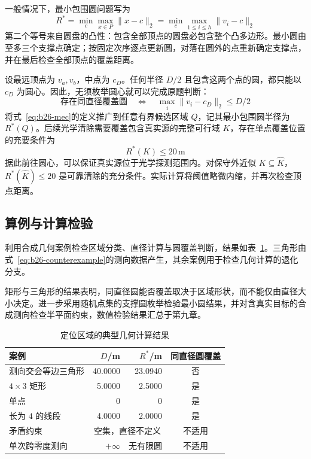 \documentclass[withoutpreface,bwprint]{cumcmthesis} %
\begin{document}
一般情况下，最小包围圆问题写为
\begin{equation}
 R^*=\min_c\max_{x\in P}\|x-c\|_2
 =\min_c\max_{1\leq i\leq h}\|v_i-c\|_2
 \label{eq:b26-mec}
\end{equation}
第二个等号来自圆盘的凸性：包含全部顶点的圆盘必包含整个凸多边形。最小圆由至多三个支撑点确定\cite{welzl}；按固定次序逐点更新圆，对落在圆外的点重新确定支撑点，并在最后检查全部顶点的覆盖距离。

设最远顶点为 $v_a,v_b$，中点为 $c_D$。任何半径 $D/2$ 且包含这两个点的圆，都只能以 $c_D$ 为圆心。因此，无须枚举圆心就可以完成原题判断：
\begin{equation}
 \text{存在同直径覆盖圆}\quad\Longleftrightarrow\quad
 \max_i\|v_i-c_D\|_2\leq D/2
\end{equation}
将式~\eqref{eq:b26-mec}的定义推广到任意有界候选区域 $Q$，记其最小包围圆半径为 $R^*(Q)$。后续光学清除需要覆盖包含真实源的完整可行域 $K$，存在单点覆盖位置的充要条件为
\begin{equation}
 {R^*(K)\leq20\,\mathrm m}\label{eq:b26-clear}
\end{equation}
据此前往圆心，可以保证真实源位于光学探测范围内。对保守外近似 $K\subseteq\widehat K$，$R^*(\widehat K)\leq20$ 是可靠清除的充分条件。实际计算将阈值略微内缩，并再次检查顶点距离。

\subsection{算例与计算检验}
利用合成几何案例检查区域分类、直径计算与圆覆盖判断，结果如表~\ref{tab:b26-q1}。三角形由式~\eqref{eq:b26-counterexample}的测向数据产生，其余案例用于检查几何计算的退化分支。

矩形与三角形的结果表明，同直径圆能否覆盖取决于区域形状，而不能仅由直径大小决定。进一步采用随机点集的支撑圆枚举检验最小圆结果，并对含真实目标的合成测向检查半平面约束，数值检验结果汇总于第九章。
\begin{table}[htbp]
 \centering\caption{定位区域的典型几何计算结果}\label{tab:b26-q1}
 \begin{tabular}{lrrc}
 \toprule
 案例 & $D$/m & $R^*$/m & 同直径圆覆盖\\
 \midrule
 测向交会等边三角形 &40.0000&23.0940&否\\
 $4\times3$ 矩形 &5.0000&2.5000&是\\
 单点 &0&0&是\\
 长为 $4$ 的线段 &4.0000&2.0000&是\\
 矛盾约束 &\multicolumn{2}{c}{空集，直径不定义}&不适用\\
 单次跨零度测向 & $+\infty$ & 无有限圆 &不适用\\
 \bottomrule
 \end{tabular}
\end{table}
\end{document}
